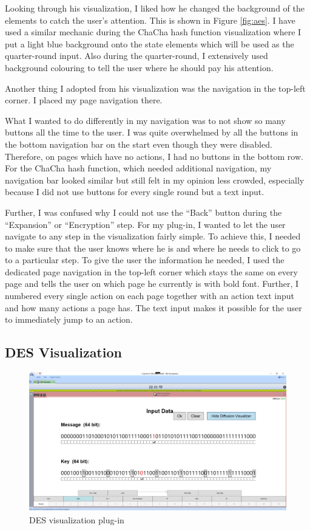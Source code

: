 Looking through his visualization, I liked how he changed the background of the elements to catch the user's attention. This is shown in Figure \ref{fig:aes}. I have used a similar mechanic during the ChaCha hash function visualization where I put a light blue background onto the state elements which will be used as the quarter-round input. Also during the quarter-round, I extensively used background colouring to tell the user where he should pay his attention.

Another thing I adopted from his visualization was the navigation in the top-left corner. I placed my page navigation there.

What I wanted to do differently in my navigation was to not show so many buttons all the time to the user. I was quite overwhelmed by all the buttons in the bottom navigation bar on the start even though they were disabled. Therefore, on pages which have no actions, I had no buttons in the bottom row. For the ChaCha hash function, which needed additional navigation, my navigation bar looked similar but still felt in my opinion less crowded, especially because I did not use buttons for every single round but a text input.

Further, I was confused why I could not use the ``Back'' button during the ``Expansion'' or ``Encryption'' step. For my plug-in, I wanted to let the user navigate to any step in the visualization fairly simple. To achieve this, I needed to make sure that the user knows where he is and where he needs to click to go to a particular step. To give the user the information he needed, I used the dedicated page navigation in the top-left corner which stays the same on every page and tells the user on which page he currently is with bold font. Further, I numbered every single action on each page together with an action text input and how many actions a page has. The text input makes it possible for the user to immediately jump to an action.

\subsection{DES Visualization}
\label{sec:desVisualization}

\begin{figure}
\centering
\includegraphics[width=\textwidth]{figures/ct2/des.png}
\caption{DES visualization plug-in}
\label{fig:des}
\end{figure}

